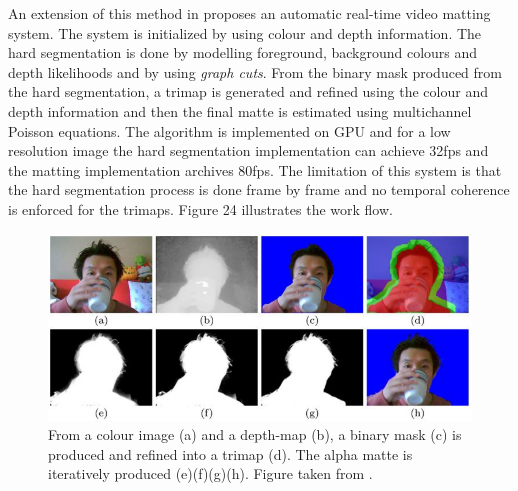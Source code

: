 An extension of this method in \cite{realtimetof} proposes an automatic real-time video matting system. The system is initialized by using colour and depth information. The hard segmentation is done by modelling foreground, background colours and depth likelihoods and by using \textit{graph cuts}. From the binary mask produced from the hard segmentation, a trimap is generated and refined using the colour and depth information and then the final matte is estimated using multichannel Poisson equations. The algorithm is implemented on GPU and for a low resolution image the hard segmentation implementation can achieve 32fps and the matting implementation archives 80fps. The limitation of this system is that the hard segmentation process is done frame by frame and no temporal coherence is enforced for the trimaps. Figure 24 illustrates the work flow.

\begin{figure}[t!]
\centering
\includegraphics[width=0.8\columnwidth]{Chapter2/2/depth_figure_2.jpg}
\caption[Real-time matting with depth.]{From a colour image (a) and a depth-map (b), a binary mask (c) is produced and refined into a trimap (d). The alpha matte is iteratively produced (e)(f)(g)(h). Figure taken from \cite{realtimetof}.}
\label{fig:depth-f2}
\end{figure}

